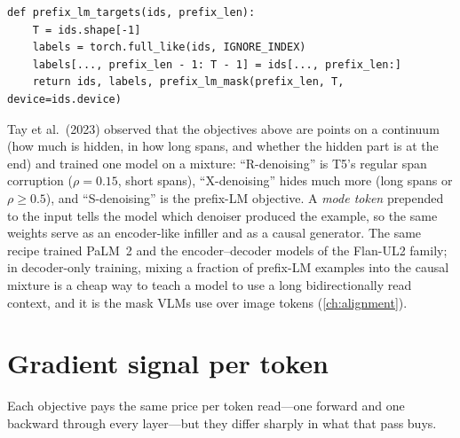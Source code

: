 \begin{lstlisting}[caption={Prefix-LM targets.},label={lst:encoders:prefix}]
def prefix_lm_targets(ids, prefix_len):
    T = ids.shape[-1]
    labels = torch.full_like(ids, IGNORE_INDEX)
    labels[..., prefix_len - 1: T - 1] = ids[..., prefix_len:]
    return ids, labels, prefix_lm_mask(prefix_len, T, device=ids.device)
\end{lstlisting}

\begin{deepdive}
Tay et al.\ (2023) observed that the objectives above are points on a continuum (how much is
hidden, in how long spans, and whether the hidden part is at the end) and trained one model on a
mixture: ``R-denoising'' is T5's regular span corruption ($\rho=0.15$, short spans), ``X-denoising''
hides much more (long spans or $\rho\ge0.5$), and ``S-denoising'' is the prefix-LM objective. A
\emph{mode token} prepended to the input tells the model which denoiser produced the example, so the
same weights serve as an encoder-like infiller and as a causal generator. The same recipe trained
PaLM~2 and the encoder--decoder models of the Flan-UL2 family; in decoder-only training, mixing a
fraction of prefix-LM examples into the causal mixture is a cheap way to teach a model to use a long
bidirectionally read context, and it is the mask VLMs use over image tokens (\cref{ch:alignment}).
\end{deepdive}

\section{Gradient signal per token}\label{sec:encoders:signal}

Each objective pays the same price per token read---one forward and one backward through every
layer---but they differ sharply in what that pass buys.

